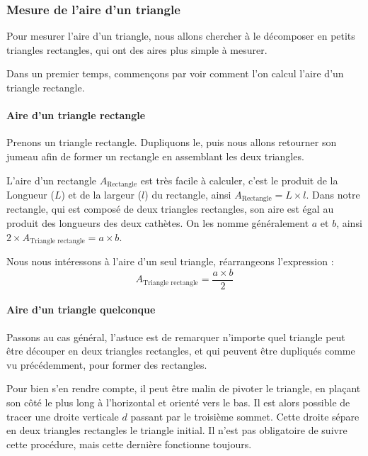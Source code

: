 \documentclass[a4paper, twoside]{article}
\begin{document}
\newpage

\subsubsection{Mesure de l'aire d'un triangle}

Pour mesurer l'aire d'un triangle, nous allons chercher à le décomposer
en petits triangles rectangles, qui ont des aires plus simple à mesurer.

Dans un premier temps, commençons par voir comment l'on
calcul l'aire d'un triangle rectangle.

\paragraph*{Aire d'un triangle rectangle}

Prenons un triangle rectangle.
Dupliquons le, puis nous allons retourner
son jumeau afin de former un rectangle en assemblant les deux triangles.

L'aire d'un rectangle $A_{\text{Rectangle}}$ est très facile à calculer,
c'est le produit de la Longueur ($L$) et de la largeur ($l$) du rectangle,
ainsi $A_{\text{Rectangle}} = L \times l$.
Dans notre rectangle, qui est composé de deux triangles rectangles,
son aire est égal au produit des longueurs des deux cathètes.
On les nomme généralement $a$ et $b$, ainsi $2 \times A_{\text{Triangle rectangle}} = a \times b$.

Nous nous intéressons à l'aire d'un seul triangle,
réarrangeons l'expression : $$ A_{\text{Triangle rectangle}} = \frac{a \times b}{2} $$

\paragraph*{Aire d'un triangle quelconque}

Passons au cas général, l'astuce est de remarquer n'importe quel triangle
peut être découper en deux triangles rectangles,
et qui peuvent être dupliqués comme vu précédemment, pour former des rectangles.

Pour bien s'en rendre compte,
il peut être malin de pivoter le triangle,
en plaçant son côté le plus long à l'horizontal et orienté vers le bas.
Il est alors possible de tracer une droite verticale $d$ passant par le troisième sommet.
Cette droite sépare en deux triangles rectangles le triangle initial.
Il n'est pas obligatoire de suivre cette procédure,
mais cette dernière fonctionne toujours.
\end{document}
